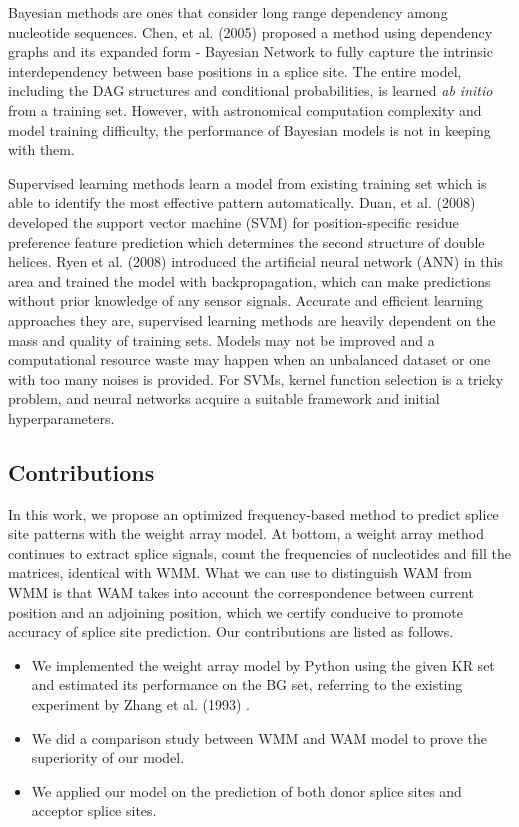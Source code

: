 \documentclass[journal,twoside]{IEEEtran}
\begin{document}
Bayesian methods are ones that consider long range dependency among nucleotide sequences. Chen, et al. (2005) \cite{chen2005prediction} proposed a method using dependency graphs and its expanded form - Bayesian Network to fully capture the intrinsic interdependency between base positions in a splice site. The entire model, including the DAG structures and conditional probabilities, is learned \textsl{ab initio} from a training set. However, with astronomical computation complexity and model training difficulty, the performance of Bayesian models is not in keeping with them. 

Supervised learning methods learn a model from existing training set which is able to identify the most effective pattern automatically. Duan, et al. (2008) \cite{duan2008position} developed the support vector machine (SVM) for position-specific residue preference feature prediction which determines the second structure of double helices. Ryen et al. (2008) \cite{ryen2008splice} introduced the artificial neural network (ANN) in this area and trained the model with backpropagation, which can make predictions without prior knowledge of any sensor signals. Accurate and efficient learning approaches they are, supervised learning methods are heavily dependent on the mass and quality of training sets. Models may not be improved and a computational resource waste may happen when an unbalanced dataset or one with too many noises is provided. For SVMs, kernel function selection is a tricky problem, and neural networks acquire a suitable framework and initial hyperparameters. 

\subsection{Contributions}\label{1.2}

In this work, we propose an optimized frequency-based method to predict splice site patterns with the weight array model. At bottom, a weight array method continues to extract splice signals, count the frequencies of nucleotides and fill the matrices, identical with WMM. What we can use to distinguish WAM from WMM is that WAM takes into account the correspondence between current position and an adjoining position, which we certify conducive to promote accuracy of splice site prediction. Our contributions are listed as follows. 

\begin{itemize}
\item We implemented the weight array model by Python using the given KR set and estimated its performance on the BG set, referring to the existing experiment by Zhang et al. (1993) \cite{zhang1993weight}.
\item We did a comparison study between WMM and WAM model to prove the superiority of our model. 
\item We applied our model on the prediction of both donor splice sites and acceptor splice sites. 
\end{itemize}
\end{document}
